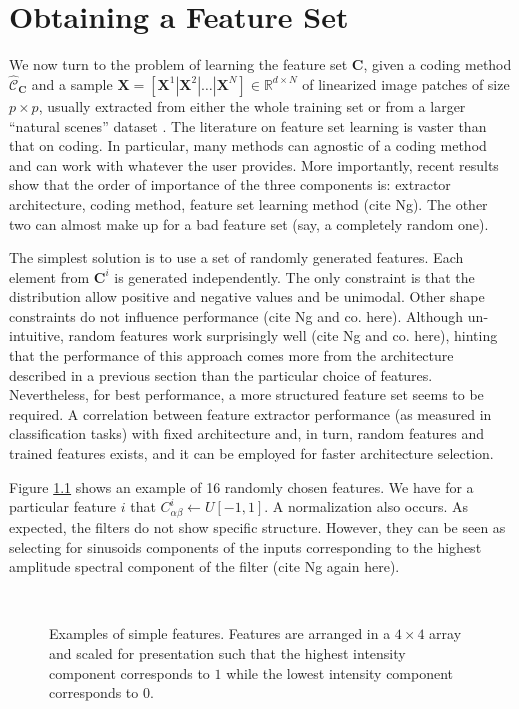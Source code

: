 \documentclass[12pt,a4paper,oneside,english]{UPBThesis}
\newcommand{\hctimes}[2]{{#1}\!\times\!{#2}}
\begin{document}
\chapter{Obtaining a Feature Set}

We now turn to the problem of learning the feature set $\textbf{C}$, given a coding method $\hat{\mathcal{C}}_\textbf{C}$ and a sample $\textbf{X} = \left[ \textbf{X}^1 \left|\right. \textbf{X}^2 \left|\right. \dots \left|\right. \textbf{X}^N \right] \in \mathbb{R}^{\hctimes{d}{N}}$ of linearized image patches of size $\hctimes{p}{p}$, usually extracted from either the whole training set or from a larger ``natural scenes'' dataset \cite{self-taught-learning}. The literature on feature set learning is vaster than that on coding. In particular, many methods can agnostic of a coding method and can work with whatever the user provides. More importantly, recent results show that the order of importance of the three components is: extractor architecture, coding method, feature set learning method (cite Ng). The other two can almost make up for a bad feature set (say, a completely random one).

The simplest solution is to use a set of randomly generated features. Each element from $\textbf{C}^i$ is generated independently. The only constraint is that the distribution allow positive and negative values and be unimodal. Other shape constraints do not influence performance (cite Ng and co. here). Although un-intuitive, random features work surprisingly well (cite Ng and co. here), hinting that the performance of this approach comes more from the architecture described in a previous section than the particular choice of features. Nevertheless, for best performance, a more structured feature set seems to be required. A correlation between feature extractor performance (as measured in classification tasks) with fixed architecture and, in turn, random features and trained features exists, and it can be employed for faster architecture selection.

Figure \ref{fig:RandomAndHandmadeFeatures} shows an example of 16 randomly chosen features. We have for a particular feature $i$ that $C^i_{\alpha\beta} \leftarrow U[-1,1]$. A normalization also occurs. As expected, the filters do not show specific structure. However, they can be seen as selecting for sinusoids components of the inputs corresponding to the highest amplitude spectral component of the filter (cite Ng again here).

\begin{figure}
\centering
{}
~~~~~~
\caption{Examples of simple features. Features are arranged in a $\hctimes{4}{4}$ array and scaled for presentation such that the highest intensity component corresponds to $1$ while the lowest intensity component corresponds to $0$.}
\label{fig:RandomAndHandmadeFeatures}
\end{figure}
\end{document}
